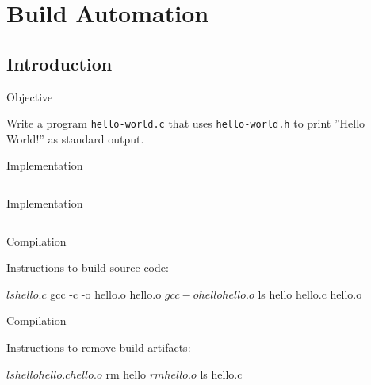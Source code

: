 \documentclass[compress]{beamer}
\begin{document}
\prepareCover

\section{Build Automation}

\subsection{Introduction}

\begin{slide}
	\begin{block}{Objective}

	Write a program \texttt{hello-world.c} that uses \texttt{hello-world.h} to print ''Hello World!'' as standard output.

	\end{block}
\end{slide}

\begin{slide}
	\begin{block}{Implementation}

	\inputminted[fontsize=\footnotesize, firstline=10, linenos]{c}{
		\resDirectory/hello.c
	}

	\end{block}
\end{slide}

\begin{slide}
	\begin{block}{Implementation}


	\inputminted[fontsize=\footnotesize, firstline=10, linenos]{c}{
		\resDirectory/hello.h
	}

	\end{block}
\end{slide}

\begin{slide}
	\begin{block}{Compilation}

	Instructions to build source code:

	\begin{terminal}
	$ ls
	hello.c
	$ gcc -c -o hello.o hello.o
	$ gcc -o hello hello.o
	$ ls
	hello hello.c hello.o
	\end{terminal}

	\end{block}
\end{slide}

\begin{slide}
	\begin{block}{Compilation}

	Instructions to remove build artifacts:

	\begin{terminal}
	$ ls
	hello hello.c hello.o
	$ rm hello
	$ rm hello.o
	$ ls
	hello.c
	\end{terminal}

	\end{block}
\end{slide}
\end{document}
